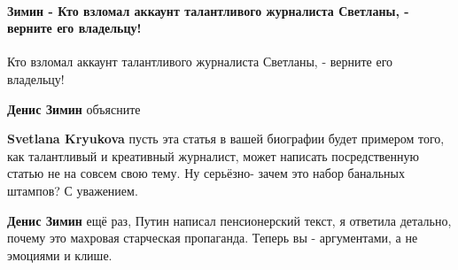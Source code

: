  
 
 
 
 
\paragraph{Зимин - Кто взломал аккаунт талантливого журналиста Светланы, - верните его владельцу!}
\label{sec:14_07_2021.fb.krjukova_svetlana.1.statja_putina_mnenie.cmt.zimin_vzlom}

\begin{itemize}
 
Кто взломал аккаунт талантливого журналиста Светланы, - верните его владельцу!


 
\textbf{Денис Зимин} объясните

 
\textbf{Svetlana Kryukova} пусть эта статья в вашей биографии будет примером того, как талантливый и креативный журналист, может написать посредственную статью не на совсем свою тему. Ну серьёзно- зачем это набор банальных штампов? С уважением.


 
\textbf{Денис Зимин} ещё раз, Путин написал пенсионерский текст, я ответила детально, почему это махровая старческая пропаганда. Теперь вы - аргументами, а не эмоциями и клише.


\end{itemize}
